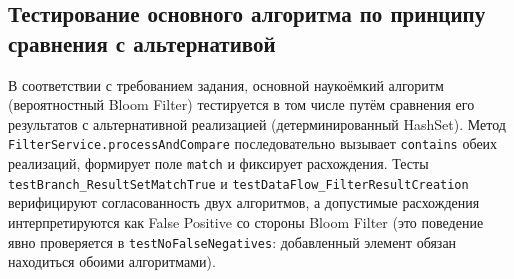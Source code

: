 \subsection{Тестирование основного алгоритма по принципу сравнения с альтернативой}
В соответствии с требованием задания, основной наукоёмкий алгоритм (вероятностный Bloom Filter) тестируется в том числе путём сравнения его результатов с альтернативной реализацией (детерминированный HashSet). Метод \texttt{FilterService.processAndCompare} последовательно вызывает \texttt{contains} обеих реализаций, формирует поле \texttt{match} и фиксирует расхождения. Тесты \texttt{testBranch\_ResultSetMatchTrue} и \texttt{testDataFlow\_FilterResultCreation} верифицируют согласованность двух алгоритмов, а допустимые расхождения интерпретируются как False Positive со стороны Bloom Filter (это поведение явно проверяется в \texttt{testNoFalseNegatives}: добавленный элемент обязан находиться обоими алгоритмами).

\newpage
